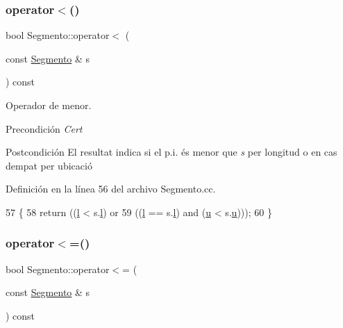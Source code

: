 \subsubsection{\texorpdfstring{operator$<$()}{operator<()}}
{\footnotesize\ttfamily bool Segmento\+::operator$<$ (\begin{DoxyParamCaption}\item[{const \hyperlink{class_segmento}{Segmento} \&}]{s }\end{DoxyParamCaption}) const}



Operador de menor. 

\begin{DoxyPrecond}{Precondición}
{\itshape Cert} 
\end{DoxyPrecond}
\begin{DoxyPostcond}{Postcondición}
El resultat indica si el p.\+i. és menor que {\itshape s} per longitud o en cas d\textquotesingle{}empat per ubicació 
\end{DoxyPostcond}


Definición en la línea 56 del archivo Segmento.\+cc.


\begin{DoxyCode}
57 \{
58   \textcolor{keywordflow}{return} ((\hyperlink{class_segmento_a8b59abc9de156b52370dd759beab031d}{l} < s.\hyperlink{class_segmento_a8b59abc9de156b52370dd759beab031d}{l}) or
59           ((\hyperlink{class_segmento_a8b59abc9de156b52370dd759beab031d}{l} == s.\hyperlink{class_segmento_a8b59abc9de156b52370dd759beab031d}{l}) and (\hyperlink{class_segmento_a7fab9490df9b1b655bb88c2deb6e72ef}{u} < s.\hyperlink{class_segmento_a7fab9490df9b1b655bb88c2deb6e72ef}{u})));
60 \}
\end{DoxyCode}
\mbox{\label{class_segmento_acc183ac638eab6f484d17ced4f66cf8e}} 
\subsubsection{\texorpdfstring{operator$<$=()}{operator<=()}}
{\footnotesize\ttfamily bool Segmento\+::operator$<$= (\begin{DoxyParamCaption}\item[{const \hyperlink{class_segmento}{Segmento} \&}]{s }\end{DoxyParamCaption}) const}



